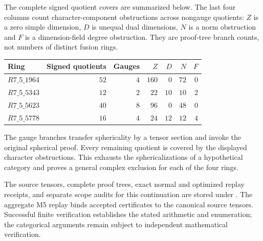 The complete signed quotient covers are summarized below.  The last
four columns count character-component obstructions across nongauge
quotients: $Z$ is a zero simple dimension, $D$ is unequal dual
dimensions, $N$ is a norm obstruction and $F$ is a dimension-field
degree obstruction.  They are proof-tree branch counts, not numbers
of distinct fusion rings.
\begin{center}\small
\begin{tabular}{@{}l r r r r r r@{}}
\toprule
Ring & Signed quotients & Gauges & $Z$ & $D$ & $N$ & $F$\\
\midrule
$R7\_5\_1964$ & $52$ & $4$ & $160$ & $0$ & $72$ & $0$\\
$R7\_5\_5343$ & $12$ & $2$ & $22$ & $10$ & $10$ & $2$\\
$R7\_5\_5623$ & $40$ & $8$ & $96$ & $0$ & $48$ & $0$\\
$R7\_5\_5778$ & $16$ & $4$ & $24$ & $12$ & $12$ & $4$\\
\bottomrule
\end{tabular}
\end{center}
The gauge branches transfer sphericality by a tensor section and
invoke the original spherical proof.  Every remaining quotient is
covered by the displayed character obstructions.  This exhausts the
sphericalizations of a hypothetical category and proves a general
complex exclusion for each of the four rings.

The source tensors, complete proof trees, exact normal and optimized
replay receipts, and separate scope audits for this continuation are
stored under .  The aggregate M5 replay
binds accepted certificates to the canonical source tensors.  Successful
finite verification establishes the stated arithmetic and enumeration;
the categorical arguments remain subject to independent mathematical
verification.
